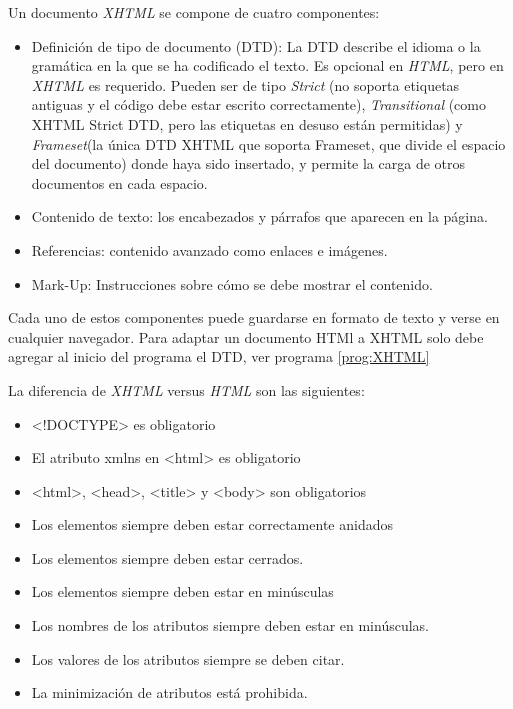 Un documento \textit{XHTML} se compone de cuatro componentes:

\begin{itemize}
	\item Definición de tipo de documento (DTD): La DTD describe el idioma o la gramática en la que se ha codificado el texto. Es opcional en \textit{HTML}, pero en \textit{XHTML} es requerido.  Pueden ser de tipo \textit{Strict} (no soporta etiquetas antiguas y el código debe estar escrito correctamente), \textit{Transitional} (como XHTML Strict DTD, pero las etiquetas en desuso están permitidas) y \textit{Frameset}(la única DTD XHTML que soporta Frameset, que divide el espacio del documento) donde haya sido insertado, y permite la carga de otros documentos en cada espacio.
	\item Contenido de texto: los encabezados y párrafos que aparecen en la página.
	\item Referencias: contenido avanzado como enlaces e imágenes.
	\item Mark-Up: Instrucciones sobre cómo se debe mostrar el contenido.
\end{itemize}
Cada uno de estos componentes  puede guardarse en formato de texto y verse en cualquier navegador.  
Para adaptar un documento HTMl a XHTML solo debe agregar al inicio del programa el DTD, ver programa \ref{prog:XHTML}
 
      \label{prog:XHTML}
     
     La diferencia de \textit{XHTML} versus \textit{HTML} son las siguientes:
     
     \begin{itemize}
     	\item <!DOCTYPE> es obligatorio
     	\item El atributo xmlns en <html> es obligatorio
     	\item <html>, <head>, <title> y <body> son obligatorios
     	\item Los elementos siempre deben estar correctamente anidados
     	\item Los elementos siempre deben estar cerrados.
     	\item Los elementos siempre deben estar en minúsculas
     	\item Los nombres de los atributos siempre deben estar en minúsculas.
     	\item Los valores de los atributos siempre se deben citar.
     	\item La minimización de atributos está prohibida.
     \end{itemize}

